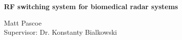 \documentclass{article}
\title{}
\author{}
\date{}
\begin{document}

\begin{center}
  \begin{minipage}{.19\linewidth}
  \end{minipage}
  \begin{minipage}{\linewidth}
    \begin{center}
      \Huge \textbf{RF switching system for biomedical radar systems}
    \end{center}
  \end{minipage}
  \hspace{.03\linewidth}
  \begin{minipage}{\linewidth}
    \begin{flushright}
      	Matt Pascoe \\ Supervisor: Dr. Konstanty Bialkowski
    \end{flushright}
  \end{minipage}
\end{center}

\vspace{.1cm}

\end{document}
